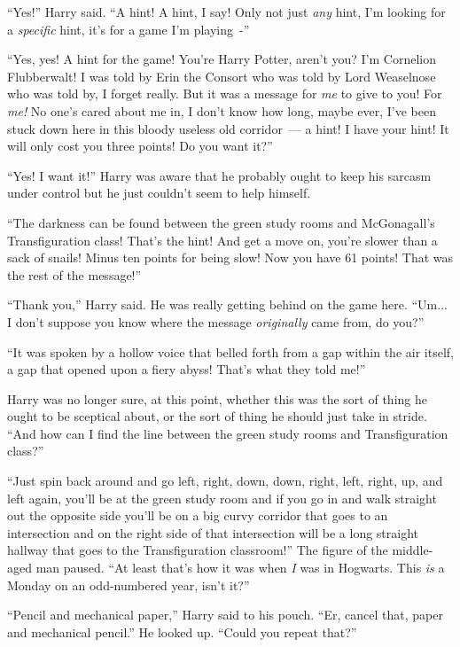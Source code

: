 ``Yes!'' Harry said. ``A hint! A hint, I say! Only not just \emph{any} hint, I'm looking for a \emph{specific} hint, it's for a game I'm playing~-''

``Yes, yes! A hint for the game! You're Harry Potter, aren't you? I'm Cornelion Flubberwalt! I was told by Erin the Consort who was told by Lord Weaselnose who was told by, I forget really. But it was a message for \emph{me} to give to you! For \emph{me!} No one's cared about me in, I don't know how long, maybe ever, I've been stuck down here in this bloody useless old corridor~--- a hint! I have your hint! It will only cost you three points! Do you want it?''

``Yes! I want it!'' Harry was aware that he probably ought to keep his sarcasm under control but he just couldn't seem to help himself.

``The darkness can be found between the green study rooms and McGonagall's Transfiguration class! That's the hint! And get a move on, you're slower than a sack of snails! Minus ten points for being slow! Now you have 61 points! That was the rest of the message!''

``Thank you,'' Harry said. He was really getting behind on the game here. ``Um... I don't suppose you know where the message \emph{originally} came from, do you?''

``It was spoken by a hollow voice that belled forth from a gap within the air itself, a gap that opened upon a fiery abyss! That's what they told me!''

Harry was no longer sure, at this point, whether this was the sort of thing he ought to be sceptical about, or the sort of thing he should just take in stride. ``And how can I find the line between the green study rooms and Transfiguration class?''

``Just spin back around and go left, right, down, down, right, left, right, up, and left again, you'll be at the green study room and if you go in and walk straight out the opposite side you'll be on a big curvy corridor that goes to an intersection and on the right side of that intersection will be a long straight hallway that goes to the Transfiguration classroom!'' The figure of the middle-aged man paused. ``At least that's how it was when \emph{I} was in Hogwarts. This \emph{is} a Monday on an odd-numbered year, isn't it?''

``Pencil and mechanical paper,'' Harry said to his pouch. ``Er, cancel that, paper and mechanical pencil.'' He looked up. ``Could you repeat that?''

